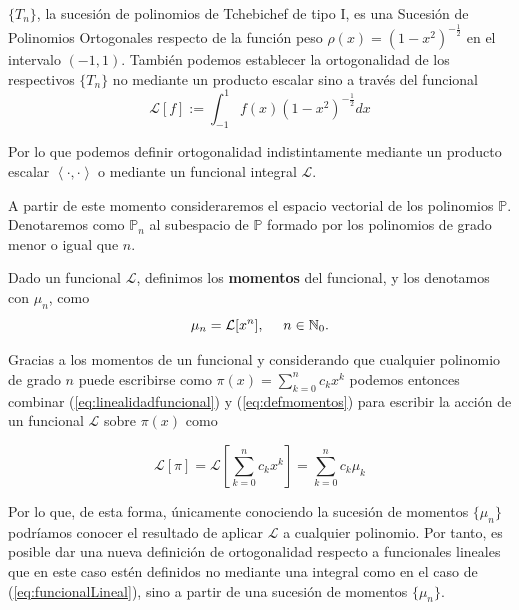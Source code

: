 \begin{ejemplo}
    $\{T_n\}$, la sucesión de polinomios de Tchebichef de tipo I, es una Sucesión de Polinomios Ortogonales respecto de la función peso $\rho(x)=(1-x^2)^{-\frac{1}{2}}$ en el intervalo $(-1,1)$. También podemos establecer la ortogonalidad de los respectivos $\{T_n\}$ no mediante un producto escalar sino a través del funcional
    \begin{equation}
        \label{eq:funcional-tchebichef}
        \mathcal{L}[f]:= \int_{-1}^1 f(x)(1-x^2)^{-\frac{1}{2}}dx
    \end{equation}
\end{ejemplo}

Por lo que podemos definir ortogonalidad indistintamente mediante un producto escalar $\left\langle\cdot,\cdot\right\rangle$ o mediante un funcional integral $\mathcal{L}$.

A partir de este momento consideraremos el espacio vectorial de los polinomios $\mathbb{P}$. Denotaremos como $\mathbb{P}_n$ al subespacio de $\mathbb{P}$ formado por los polinomios de grado menor o igual que $n$.


\begin{definicion}
    Dado un funcional $\mathcal{L}$, definimos los \textbf{momentos} del funcional, y los denotamos con $\mu_n$, como
    \begin{equation}
        \label{eq:defmomentos}
        \mu_n = \mathcal{L}[x^n], \ \ \ \ n\in\mathbb{N}_0.
    \end{equation}    
\end{definicion}

Gracias a los momentos de un funcional y considerando que cualquier polinomio de grado $n$ puede escribirse como $\pi(x)=\sum_{k=0}^n c_k x^k$ podemos entonces combinar (\ref{eq:linealidadfuncional}) y (\ref{eq:defmomentos}) para  escribir la acción de un funcional $\mathcal{L}$ sobre $\pi(x)$ como

$$
\mathcal{L}[\pi] = \mathcal{L}\left[ \sum_{k=0}^n c_k x^k \right] = \sum_{k=0}^n c_k \mu_k
$$

Por lo que, de esta forma, únicamente conociendo la sucesión de momentos $\{\mu_n\}$ podríamos conocer el resultado de aplicar $\mathcal{L}$ a cualquier polinomio. Por tanto, es posible dar una nueva definición de ortogonalidad respecto a funcionales lineales que en este caso estén definidos no mediante una integral como en el caso de (\ref{eq:funcionalLineal}), sino a partir de una sucesión de momentos $\{\mu_n\}$.

